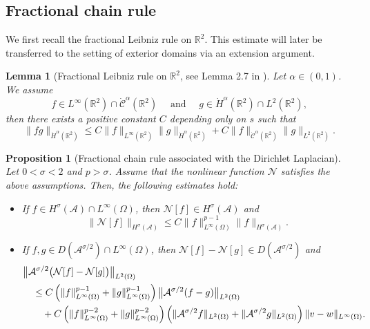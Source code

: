 \documentclass[a4paper,11pt]{article} %
\newtheorem{lemma}[theorem]{Lemma}
\newtheorem{proposition}[theorem]{Proposition}
\theoremstyle{remark}
\theoremstyle{definition}
\numberwithin{equation}{section}
\begin{document}
\subsection{Fractional chain rule}

We first recall the fractional Leibniz rule on $\mathbb R^2$. This estimate will later be transferred to the setting of exterior domains via an extension argument.

\begin{lemma}[Fractional Leibniz rule on $\mathbb R^2$, see Lemma 2.7 in \cite{IkedaInuiWakasugi2026}]
\label{lem:Leibniz}
Let $\alpha\in (0,1)$. We assume
\[
f\in L^\infty(\mathbb R^2)\cap \dot{\mathcal{C}}^\alpha(\mathbb R^2)
\quad\text{ and }\quad
g\in \dot H^\alpha(\mathbb R^2)\cap L^2(\mathbb R^2),
\]
then there exists a positive constant $C$ depending only on $s$ such that
\begin{equation*}
\|fg\|_{\dot H^\alpha(\mathbb R^2)}
\le
C
\|f\|_{L^\infty(\mathbb R^2)}
\|g\|_{\dot H^\alpha(\mathbb R^2)}
+
C
\|f\|_{\dot{\mathcal{C}}^\alpha(\mathbb R^2)}
\|g\|_{L^2(\mathbb R^2)}.
\end{equation*}
\end{lemma}

\begin{proposition}[Fractional chain rule associated with the Dirichlet Laplacian]
\label{prop:chain}
Let $0<\sigma<2$ and $p>\sigma$. Assume that the nonlinear function $\mathcal{N}$ satisfies the above assumptions. Then, the following estimates hold:
\begin{itemize}
    \item[i)] If $f\in H^\sigma(\mathcal{A})\cap L^\infty(\Omega)$, then $\mathcal{N}[f]\in H^\sigma(\mathcal{A})$ and
    \begin{equation}
    \label{eq:chain}
    \big\|\mathcal{N}[f]\big\|_{H^\sigma(\mathcal{A})}
    \le
    C
    \|f\|_{L^\infty(\Omega)}^{p-1}
    \|f\|_{H^\sigma(\mathcal{A})}.
    \end{equation}
    \item[ii)] If $f,g\in D(\mathcal A^{\sigma/2})\cap L^\infty(\Omega)$, then $\mathcal N[f]-\mathcal N[g]\in D(\mathcal A^{\sigma/2})$
and
\begin{align}
&\bigl\|
\mathcal A^{\sigma/2}
\bigl(
\mathcal N[f]-\mathcal N[g]
\bigr)
\bigr\|_{L^2(\Omega)} \notag \\
&\quad\le
C
\left(
\|f\|_{L^\infty(\Omega)}^{p-1}
+
\|g\|_{L^\infty(\Omega)}^{p-1}
\right)
\bigl\|
\mathcal A^{\sigma/2}(f-g)
\bigr\|_{L^2(\Omega)}
\label{eq:Lip-chain-first}\\
&\qquad
+
C
\left(
\|f\|_{L^\infty(\Omega)}^{p-2}
+
\|g\|_{L^\infty(\Omega)}^{p-2}
\right)
\left(
\|\mathcal A^{\sigma/2}f\|_{L^2(\Omega)}
+
\|\mathcal A^{\sigma/2}g\|_{L^2(\Omega)}
\right)
\|v-w\|_{L^\infty(\Omega)}.
\notag
\end{align}
\end{itemize}
\end{proposition}
\end{document}
